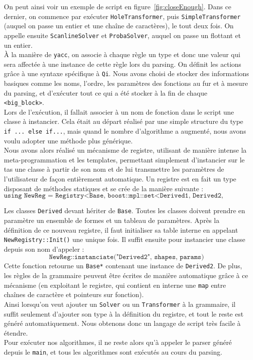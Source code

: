 On peut ainsi voir un exemple de script en figure~\ref{fig:closeEnough}. Dans ce dernier, on commence par exécuter \texttt{HoleTransformer}, puis \texttt{SimpleTransformer} (auquel on passe un entier et une chaîne de caractères), le tout deux fois. On appelle ensuite \texttt{ScanlineSolver} et \texttt{ProbaSolver}, auquel on passe un flottant et un entier.\\

À la manière de \texttt{yacc}, on associe à chaque règle un type et donc une valeur qui sera affectée à une instance de cette règle lors du parsing. On définit les actions grâce à une syntaxe spécifique à \texttt{Qi}. Nous avons choisi de stocker des informations basiques comme les noms, l'ordre, les paramètres des fonctions au fur et à mesure du parsing, et d'exécuter tout ce qui a été stocker à la fin de chaque \texttt{<big\_block>}.\\

Lors de l'exécution, il fallait associer à un nom de fonction dans le script une classe à instancier. Cela était au départ réalisé par une simple structure du type \texttt{if ... else if...}, mais quand le nombre d'algorithme a augmenté, nous avons voulu adopter une méthode plus générique.\\

Nous avons alors réalisé un mécanisme de registre, utilisant de manière intense la meta-programmation et les templates, permettant simplement d'instancier sur le tas une classe à partir de son nom et de lui transmettre les paramètres de l'utilisateur de façon entièrement automatique. Un registre est en fait un type disposant de méthodes statiques et se crée de la manière suivante :
$$\texttt{using NewReg = Registry<Base, boost::mpl::set<Derived1, Derived2, ...>::type>}$$

Les classes \texttt{Derived} devant hériter de \texttt{Base}. Toutes les classes doivent prendre en paramètre un ensemble de formes et un tableau de paramètres. Après la définition de ce nouveau registre, il faut initialiser sa table interne en appelant \texttt{NewRegistry::Init()} une unique fois. Il suffit ensuite pour instancier une classe depuis son nom d'appeler :
$$\texttt{NewReg::instanciate("Derived2", shapes, params)}$$
Cette fonction retourne un \texttt{Base*} contenant une instance de \texttt{Derived2}. De plus, les règles de la grammaire peuvent être écrites de manière automatique grâce à ce mécanisme (en exploitant le registre, qui contient en interne une \texttt{map} entre chaînes de caractère et pointeurs sur fonction).\\

Ainsi lorsqu'on veut ajouter un \texttt{Solver} ou un \texttt{Transformer} à la grammaire, il suffit seulement d'ajouter son type à la définition du registre, et tout le reste est généré automatiquement. Nous obtenons donc un langage de script très facile à étendre.\\

Pour exécuter nos algorithmes, il ne reste alors qu'à appeler le parser généré depuis le \texttt{main}, et tous les algorithmes sont exécutés au cours du parsing.
    
